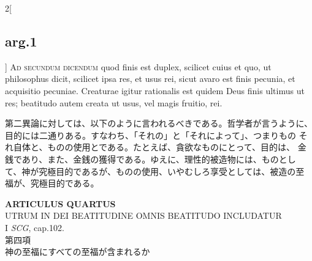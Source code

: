 \documentclass[paper=a4paper,fontsize=10pt,jafontsize=9pt,titlepage]{jlreq}
\begin{document}
\begin{paracol}{2}[\subsection{arg.1}]
{\scshape Ad secundum dicendum} quod finis est duplex, scilicet cuius et quo, ut
philosophus dicit, scilicet ipsa res, et usus rei, sicut avaro est finis
pecunia, et acquisitio pecuniae. Creaturae igitur rationalis est quidem
Deus finis ultimus ut res; beatitudo autem creata ut usus, vel magis
fruitio, rei.

\switchcolumn

第二異論に対しては、以下のように言われるべきである。哲学者が言うように、
 目的には二通りある。すなわち、「それの」と「それによって」、つまりもの
 それ自体と、ものの使用とである。たとえば、貪欲なものにとって、目的は、
 金銭であり、また、金銭の獲得である。ゆえに、理性的被造物には、ものとし
 て、神が究極目的であるが、ものの使用、いやむしろ享受としては、被造の至
 福が、究極目的である。

\end{paracol}

\newpage
{}
{}
\setcounter{section}{4}
\setcounter{subsection}{0}




\begin{center}
 {\Large {\bfseries ARTICULUS QUARTUS}}\\
 {\large UTRUM IN DEI BEATITUDINE OMNIS BEATITUDO INCLUDATUR}\\
 {\footnotesize I {\itshape SCG}, cap.102.}\\
 {\Large 第四項\\神の至福にすべての至福が含まれるか}
\end{center}
\end{document}
